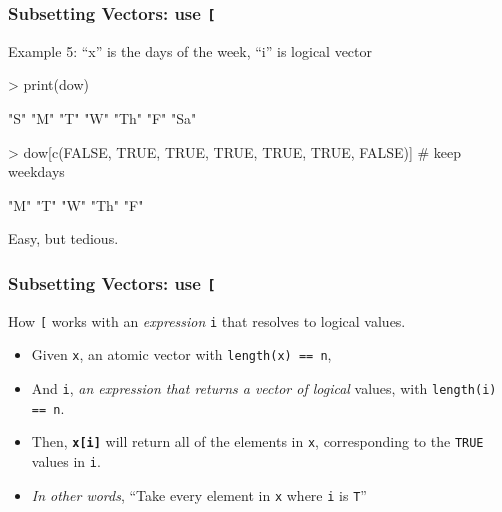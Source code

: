 \documentclass{beamer}
\newcommand{\R}[1]{\texttt{#1}}
\begin{document}
\begin{frame}[fragile]
\frametitle{Subsetting Vectors: use \R{[}}

Example 5: ``x'' is the days of the week, ``i'' is logical vector
\pause
\begin{Schunk}
\begin{Sinput}
> print(dow)
\end{Sinput}
\begin{Soutput}
[1] "S"  "M"  "T"  "W"  "Th" "F"  "Sa"
\end{Soutput}
\end{Schunk}
\pause
\begin{Schunk}
\begin{Sinput}
> dow[c(FALSE, TRUE, TRUE, TRUE, TRUE, TRUE, FALSE)]  # keep weekdays
\end{Sinput}
\end{Schunk}
\pause
\begin{Schunk}
\begin{Soutput}
[1] "M"  "T"  "W"  "Th" "F" 
\end{Soutput}
\end{Schunk}
\pause
Easy, but tedious.

\end{frame}



\begin{frame}[fragile]
\frametitle{Subsetting Vectors: use \R{[}}

How \R{[} works with an \textit{expression} \R{i} that resolves to logical values.
\begin{itemize}
\item Given \R{x}, an atomic vector with \R{length(x) == n},
\item And \R{i}, \textit{an expression that returns a vector of logical} values, with \R{length(i) == n}.
\item Then, \R{\textbf{x[i]}} will return all of the elements in \R{x}, corresponding to the \R{TRUE} values in \R{i}.
\item \textit{In other words}, ``Take every element in \R{x} where \R{i} is \R{T}''
\end{itemize}

\end{frame}
\end{document}

